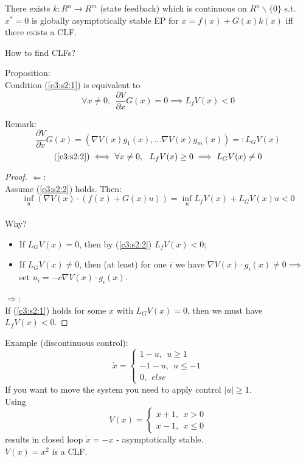 \begin{Theorem}[Artstein]
 There exists $k:R^n \to R^m$ (state feedback) which is continuous on $R^n \backslash \{ 0 \}$ s.t. $x^*=0$ is globally asymptotically stable EP for $\dot x = f(x)+G(x)k(x)$ iff there exists a CLF.
\end{Theorem}

How to find CLFs?

Proposition: \\
Condition (\ref{c3:s2:1}) is equivalent to
 \begin{equation} \label{c3:s2:2}
     \forall x \neq 0, \ \ \frac{\partial V}{\partial x}G(x) = 0 \implies L_fV(x) < 0 
 \end{equation}

Remark: 
$$\frac{\partial V}{\partial x}G(x) = (\nabla V(x)g_1(x), \dots \nabla V(x)g_m(x)) =: L_GV(x)$$
$$(\ref{c3:s2:2}) \iff \forall x \neq 0, \ \ L_fV(x) \ge 0 \implies L_GV(x) \neq 0$$
\begin{proof}
    $\Longleftarrow$: \\
    Assume (\ref{c3:s2:2}) holds. Then: \\
    $$\inf_u (\nabla V(x) \cdot (f(x)+G(x)u)) = \inf_u L_fV(x)+L_GV(x)u < 0$$ \\
    Why?
    \begin{itemize}
        \item If $L_GV(x) = 0$, then by (\ref{c3:s2:2}) $L_fV(x) < 0$;
        \item If $L_GV(x) \neq 0$, then (at least) for one $i$ we have $\nabla V(x) \cdot g_i(x) \neq 0 \implies$ set $u_i = -c \nabla V(x) \cdot g_i(x)$.
    \end{itemize}
    
    $\Longrightarrow$: \\
    If (\ref{c3:s2:1}) holds for some $x$ with $L_GV(x)=0$, then we must have $L_fV(x) < 0$.
\end{proof}

Example (discontinuous control):
$$\dot x = \left\{
                \begin{array}{ll}
                  1-u, \ \ u \ge 1\\
                  -1-u, \ \ u \le -1\\
                  0, \ \ else
                \end{array}
              \right.$$
If you want to move the system you need to apply control $|u| \ge 1$. \\
Using $$V(x) = \left\{
                \begin{array}{ll}
                  x+1, \ \ x>0\\
                  x-1, \ \ x \le 0
                \end{array}
              \right.$$
results in closed loop $\dot x = -x$ - asymptotically stable.\\
$V(x) = x^2$ is a CLF.


